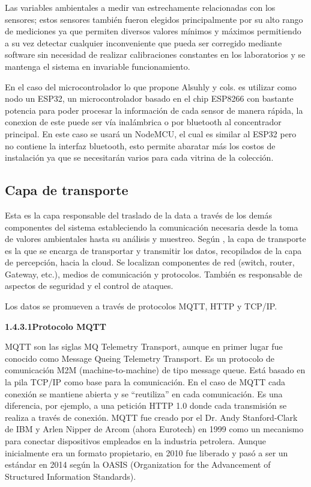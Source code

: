     Las variables ambientales a medir van estrechamente relacionadas con los sensores; estos sensores también fueron elegidos principalmente por su alto rango de mediciones ya que permiten diversos valores mínimos 
    y máximos permitiendo a su vez detectar cualquier inconveniente que pueda ser corregido mediante software sin necesidad de realizar calibraciones constantes en los laboratorios y se mantenga el sistema en invariable funcionamiento. 

    En el caso del microcontrolador lo que propone Alsuhly y cols.\cite{alsuhly} es utilizar como nodo un ESP32, un microcontrolador basado en el chip ESP8266 con bastante potencia para poder procesar la información de cada sensor de manera rápida,
    la conexion de este puede ser vía inalámbrica o por bluetooth al concentrador principal. En este caso se usará un NodeMCU, el cual es similar al ESP32 pero no contiene la interfaz bluetooth, esto permite abaratar más los costos de instalación ya que se necesitarán varios para cada vitrina de la colección.

    \subsection{Capa de transporte}\label{subsec:capa_transporte}

    Esta es la capa responsable del traslado de la data a través de los demás componentes del sistema estableciendo la comunicación necesaria desde la toma de valores ambientales hasta su análisis y muestreo.    
    Según \cite{internetOfThingsStateOfTheArt}, la capa de transporte es la que se encarga de transportar y transmitir los datos, recopilados de la capa de percepción, hacia la cloud. Se localizan componentes de red (switch, router, Gateway, etc.), medios de comunicación y protocolos. También es responsable de aspectos de seguridad y el control de ataques.
    
    Los datos se promueven a través de protocolos MQTT, HTTP y TCP/IP.
    
        \textbf{1.4.3.1\hspace{5mm}Protocolo MQTT}

    MQTT son las siglas MQ Telemetry Transport, aunque en primer lugar fue conocido como Message Queing Telemetry Transport. Es un protocolo de comunicación M2M (machine-to-machine) de tipo message queue. Está basado en la pila TCP/IP como base para la comunicación. En el caso de MQTT cada conexión se mantiene abierta y se “reutiliza” en cada comunicación. Es una diferencia, por ejemplo, a una petición HTTP 1.0 donde cada transmisión se realiza a través de conexión.
    MQTT fue creado por el Dr. Andy Stanford-Clark de IBM y Arlen Nipper de Arcom (ahora Eurotech) en 1999 como un mecanismo para conectar dispositivos empleados en la industria petrolera.
    Aunque inicialmente era un formato propietario, en 2010 fue liberado y pasó a ser un estándar en 2014 según la OASIS (Organization for the Advancement of Structured Information Standards). \cite{mqtt}\\

